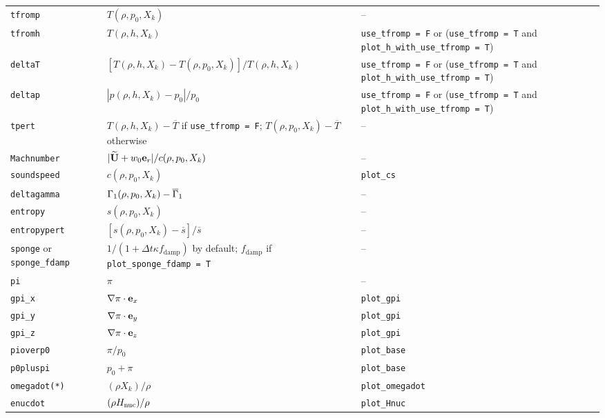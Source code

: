 {\begin{center}
\begin{longtable}{|l|p{2.25in}|p{2.5in}|}
{\tt tfromp}              & $T(\rho, p_0, X_k)$  & -- \\
{\tt tfromh}            & $T(\rho, h, X_k)$    & {\tt use\_tfromp = F} or ({\tt use\_tfromp = T} and {\tt plot\_h\_with\_use\_tfromp = T}) \\           
{\tt deltaT}            & $[T(\rho, h, X_k) - T(\rho, p_0, X_k)]/T(\rho, h, X_k)$  & {\tt use\_tfromp = F} or ({\tt use\_tfromp = T} and {\tt plot\_h\_with\_use\_tfromp = T}) \\           
{\tt deltap}            & $|p(\rho,h,X_k) - p_0|/p_0$ & {\tt use\_tfromp = F} or ({\tt use\_tfromp = T} and {\tt plot\_h\_with\_use\_tfromp = T}) \\           
{\tt tpert}               & $T(\rho,h,X_k) - \overline{T}$ if {\tt use\_tfromp = F}; $T(\rho,p_0,X_k) - \overline{T}$ otherwise & -- \\
{\tt Machnumber}          & $| \widetilde{{\bf U}} + w_0 \mathbf{e}_r | / c(\rho,p_0,X_k)$ & -- \\
{\tt soundspeed}        & $c(\rho,p_0,X_k)$ & {\tt plot\_cs} \\
{\tt deltagamma}          & $\Gamma_1(\rho,p_0,X_k) - \overline{\Gamma}_1$ & -- \\
{\tt entropy}             & $s(\rho,p_0,X_k)$ & -- \\
{\tt entropypert}         & $[s(\rho,p_0,X_k) - \overline{s}]/\overline{s}$ & -- \\
{\tt sponge} or {\tt sponge\_fdamp} & $1/(1 + \Delta t \kappa f_\mathrm{damp})$ by default; $f_\mathrm{damp}$ if {\tt plot\_sponge\_fdamp = T} & -- \\
{\tt pi}                 & $\pi$ & -- \\
{\tt gpi\_x}           & $\nabla \pi \cdot \mathbf{e}_x$ & {\tt plot\_gpi} \\
{\tt gpi\_y}           & $\nabla \pi \cdot \mathbf{e}_y$ & {\tt plot\_gpi} \\
{\tt gpi\_z}           & $\nabla \pi \cdot \mathbf{e}_z$ & {\tt plot\_gpi} \\
{\tt pioverp0}         & $\pi / p_0$ & {\tt plot\_base} \\
{\tt p0pluspi}         & $p_0 + \pi$ & {\tt plot\_base} \\
{\tt omegadot(*)}      & $(\rho X_k)/\rho$ & {\tt plot\_omegadot} \\
{\tt enucdot}          & $(\rho {H_{\rm nuc}})/\rho$ & {\tt plot\_Hnuc} \\

\end{longtable}
\end{center}}
